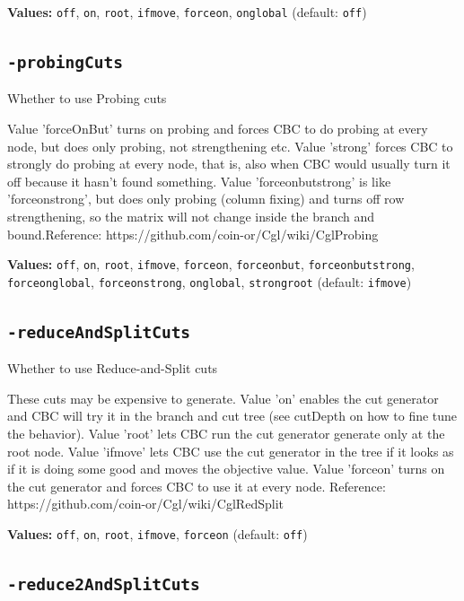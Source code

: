 \documentclass[11pt,a4paper]{article}
\begin{document}
\textbf{Values:} \texttt{off}, \texttt{on}, \texttt{root}, \texttt{ifmove}, \texttt{forceon}, \texttt{onglobal} (default: \texttt{off})

\subsection*{\texttt{-probingCuts}}

Whether to use Probing cuts

Value 'forceOnBut' turns on probing and forces CBC to do probing at every node, but does only probing, not strengthening etc. Value 'strong' forces CBC to strongly do probing at every node, that is, also when CBC would usually turn it off because it hasn't found something. Value 'forceonbutstrong' is like 'forceonstrong', but does only probing (column fixing) and turns off row strengthening, so the matrix will not change inside the branch and bound.Reference: https://github.com/coin-or/Cgl/wiki/CglProbing

\textbf{Values:} \texttt{off}, \texttt{on}, \texttt{root}, \texttt{ifmove}, \texttt{forceon}, \texttt{forceonbut}, \texttt{forceonbutstrong}, \texttt{forceonglobal}, \texttt{forceonstrong}, \texttt{onglobal}, \texttt{strongroot} (default: \texttt{ifmove})

\subsection*{\texttt{-reduceAndSplitCuts}}

Whether to use Reduce-and-Split cuts

These cuts may be expensive to generate. Value 'on' enables the cut generator and CBC will try it in the branch and cut tree (see cutDepth on how to fine tune the behavior). Value 'root' lets CBC run the cut generator generate only at the root node. Value 'ifmove' lets CBC use the cut generator in the tree if it looks as if it is doing some good and moves the objective value. Value 'forceon' turns on the cut generator and forces CBC to use it at every node.
 Reference: https://github.com/coin-or/Cgl/wiki/CglRedSplit

\textbf{Values:} \texttt{off}, \texttt{on}, \texttt{root}, \texttt{ifmove}, \texttt{forceon} (default: \texttt{off})

\subsection*{\texttt{-reduce2AndSplitCuts}}
\end{document}
